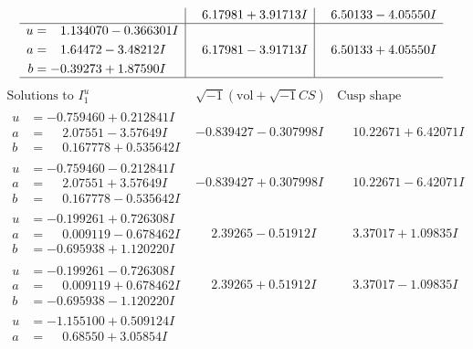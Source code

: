 \documentclass[1p]{elsarticle_modified}
\theoremstyle{definition}
\newcommand{\I}{\sqrt{-1}}
\begin{document}
$$\begin{array}{c|c|c}
 & \phantom{-}6.17981 + 3.91713 I & \phantom{-}6.50133 - 4.05550 I \\ \hline\begin{aligned}
u &= \phantom{-}1.134070 - 0.366301 I \\
a &= \phantom{-}1.64472 - 3.48212 I \\
b &= -0.39273 + 1.87590 I\end{aligned}
 & \phantom{-}6.17981 - 3.91713 I & \phantom{-}6.50133 + 4.05550 I\\
 \hline 
 \end{array}$$\newpage$$\begin{array}{c|c|c}  
\text{Solutions to }I^u_{1}& \I (\text{vol} + \sqrt{-1}CS) & \text{Cusp shape}\\
 \hline 
\begin{aligned}
u &= -0.759460 + 0.212841 I \\
a &= \phantom{-}2.07551 - 3.57649 I \\
b &= \phantom{-}0.167778 + 0.535642 I\end{aligned}
 & -0.839427 - 0.307998 I & \phantom{-}10.22671 + 6.42071 I \\ \hline\begin{aligned}
u &= -0.759460 - 0.212841 I \\
a &= \phantom{-}2.07551 + 3.57649 I \\
b &= \phantom{-}0.167778 - 0.535642 I\end{aligned}
 & -0.839427 + 0.307998 I & \phantom{-}10.22671 - 6.42071 I \\ \hline\begin{aligned}
u &= -0.199261 + 0.726308 I \\
a &= \phantom{-}0.009119 - 0.678462 I \\
b &= -0.695938 + 1.120220 I\end{aligned}
 & \phantom{-}2.39265 - 0.51912 I & \phantom{-}3.37017 + 1.09835 I \\ \hline\begin{aligned}
u &= -0.199261 - 0.726308 I \\
a &= \phantom{-}0.009119 + 0.678462 I \\
b &= -0.695938 - 1.120220 I\end{aligned}
 & \phantom{-}2.39265 + 0.51912 I & \phantom{-}3.37017 - 1.09835 I \\ \hline\begin{aligned}
u &= -1.155100 + 0.509124 I \\
a &= \phantom{-}0.68550 + 3.05854 I \\

\end{aligned}
\end{array}$$
\end{document}
